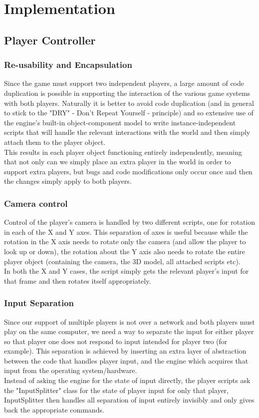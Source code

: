 \documentclass[11pt,a4paper]{article}
\begin{document}
\section{Implementation}
\label{s:implementation}
\subsection{Player Controller}
\subsubsection{Re-usability and Encapsulation}
Since the game must support two independent players, a large amount of code duplication is possible in supporting the interaction of the various game systems with both players. Naturally it is better to avoid code duplication (and in general to stick to the "DRY" - Don't Repeat Yourself - principle) and so extensive use of the engine's built-in object-component model to write instance-independent scripts that will handle the relevant interactions with the world and then simply attach them to the player object. \\
This results in each player object functioning entirely independently, meaning that not only can we simply place an extra player in the world in order to support extra players, but bugs and code modifications only occur once and then the changes simply apply to both players.
\subsubsection{Camera control}
Control of the player's camera is handled by two different scripts, one for rotation in each of the X and Y axes. This separation of axes is useful because while the rotation in the X axis needs to rotate only the camera (and allow the player to look up or down), the rotation about the Y axis also needs to rotate the entire player object (containing the camera, the 3D model, all attached scripts etc). \\
In both the X and Y cases, the script simply gets the relevant player's input for that frame and then rotates itself appropriately.
\subsubsection{Input Separation}
Since our support of multiple players is not over a network and both players must play on the same computer, we need a way to separate the input for either player so that player one does not respond to input intended for player two (for example). This separation is achieved by inserting an extra layer of abstraction between the code that handles player input, and the engine which acquires that input from the operating system/hardware. \\
Instead of asking the engine for the state of input directly, the player scripts ask the "InputSplitter" class for the state of player input for only that player, InputSplitter then handles all separation of input entirely invisibly and only gives back the appropriate commands.
\end{document}
